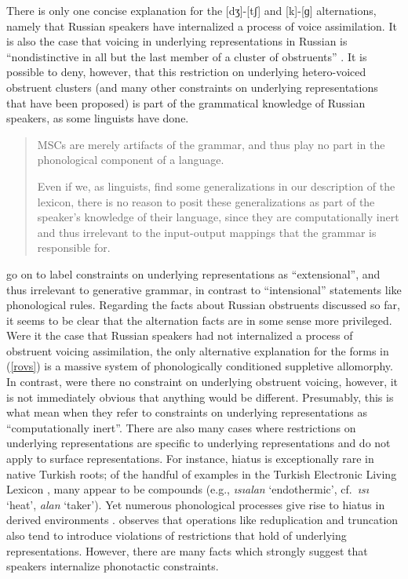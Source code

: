 There is only one concise explanation for the [dʒ]-[tʃ] and [k]-[ɡ] alternations, namely that Russian speakers have internalized a process of voice assimilation.
It is also the case that voicing in underlying representations in Russian is ``nondistinctive in all but the last member of a cluster of obstruents'' \citep[283]{A74}.
It is possible to deny, however, that this restriction on underlying hetero-voiced obstruent clusters (and many other constraints on underlying representations that have been proposed) is part of the grammatical knowledge of Russian speakers, as some linguists have done.

\begin{quote}
MSCs are merely artifacts of the grammar, and thus play no part in the phonological component of a language. \citep[302]{Clayton1976}

Even if we, as linguists, find some generalizations in our description of the lexicon, there is no reason to posit these generalizations as part of the speaker's knowledge of their language, since they are computationally inert and thus irrelevant to the input-output mappings that the grammar is responsible for. \citep[17f.]{PE}
\end{quote}

\noindent
\citeauthor{PE} go on to label constraints on underlying representations as ``extensional'', and thus irrelevant to generative grammar, in contrast to ``intensional'' statements like phonological rules.
Regarding the facts about Russian obstruents discussed so far, it seems to be clear that the alternation facts are in some sense more privileged.
Were it the case that Russian speakers had not internalized a process of obstruent voicing assimilation, the only alternative explanation for the forms in (\ref{rovs}) is a massive system of phonologically conditioned suppletive allomorphy.
In contrast, were there no constraint on underlying obstruent voicing, however, it is not immediately obvious that anything would be different.
Presumably, this is what \citeauthor{PE} mean when they refer to constraints on underlying representations as ``computationally inert''.
There are also many cases where restrictions on underlying representations are specific to underlying representations and do not apply to surface representations.
For instance, hiatus is exceptionally rare in native Turkish roots; of the handful of examples in the Turkish Electronic Living Lexicon \citep{TELL}, many appear to be compounds (e.g., \emph{ısıalan} `endothermic', cf.~\emph{ısı} `heat', \emph{alan} `taker').
Yet numerous phonological processes give rise to hiatus in derived environments \citep[e.g.,][]{Kabak2007b}.
\citet{Silverman2000} observes that operations like reduplication and truncation also tend to introduce violations of restrictions that hold of underlying representations.
However, there are many facts which strongly suggest that speakers internalize phonotactic constraints.

